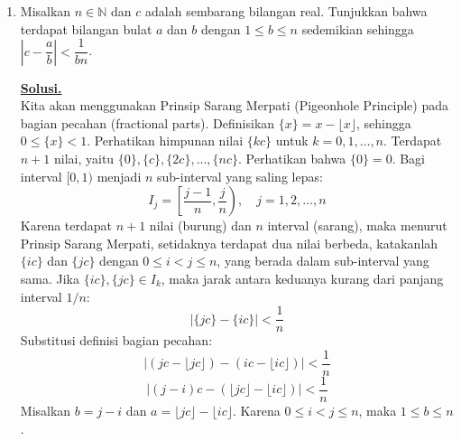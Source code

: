 \documentclass[12pt,twoside]{article}
\newenvironment{solution}
{
	\par\noindent\textbf{\underline{Solusi.}}\\
}
{
	\par
}
\begin{document}
\begin{enumerate}
\begin{solution}
          \textbf{(b) Sanggahan untuk $bac=e$}
          Pernyataan $bac=e$ tidak selalu benar. Ini hanya benar jika grup $G$ abel atau jika $a$ dan $b$ komutatif.
          \textbf{Contoh Penyangkalan:}
          Misalkan $G = S_3$, grup permutasi dari $\{1, 2, 3\}$.
          Pilih $a = (1 \ 2)$ dan $b = (1 \ 3)$.
          Perhatikan bahwa $a^{-1} = a$ dan $b^{-1} = b$.
          Hitung $c$ sedemikian sehingga $abc=e$.
          Maka $c = (ab)^{-1} = b^{-1}a^{-1} = ba$.
          Hitung $a b$:
          \[ a b = (1 \ 2)(1 \ 3) = (1 \ 3 \ 2) \]
          Maka $c = (1 \ 3 \ 2)^{-1} = (1 \ 2 \ 3)$.
          Periksa $abc = (1 \ 3 \ 2)(1 \ 2 \ 3) = e$. (Konsisten).
          Sekarang periksa nilai $bac$:
          Hitung $b a$:
          \[ b a = (1 \ 3)(1 \ 2) = (1 \ 2 \ 3) \]
          Maka:
          \[ bac = (b a) c = (1 \ 2 \ 3)(1 \ 2 \ 3) = (1 \ 3 \ 2) \]
          Karena $(1 \ 3 \ 2) \neq e$, maka pernyataan $bac=e$ bernilai \textbf{salah}.
        \end{solution}
  \item Misalkan $n\in \mathbb{N}$ dan $c$ adalah sembarang bilangan real. Tunjukkan bahwa terdapat bilangan bulat $a$ dan $b$ dengan $1\leq b\leq n$ sedemikian sehingga $\left|c-\dfrac{a}{b}\right|<\dfrac{1}{bn}$.
        \begin{solution}
          Kita akan menggunakan Prinsip Sarang Merpati (Pigeonhole Principle) pada bagian pecahan (fractional parts).
          Definisikan $\{x\} = x - \lfloor x \rfloor$, sehingga $0 \leq \{x\} < 1$.
          Perhatikan himpunan nilai $\{k c\}$ untuk $k = 0, 1, \dots, n$. Terdapat $n+1$ nilai, yaitu $\{0\}, \{c\}, \{2c\}, \dots, \{nc\}$. Perhatikan bahwa $\{0\} = 0$.
          Bagi interval $[0, 1)$ menjadi $n$ sub-interval yang saling lepas:
          \[ I_j = \left[ \frac{j-1}{n}, \frac{j}{n} \right), \quad j = 1, 2, \dots, n \]
          Karena terdapat $n+1$ nilai (burung) dan $n$ interval (sarang), maka menurut Prinsip Sarang Merpati, setidaknya terdapat dua nilai berbeda, katakanlah $\{i c\}$ dan $\{j c\}$ dengan $0 \leq i < j \leq n$, yang berada dalam sub-interval yang sama.
          Jika $\{i c\}, \{j c\} \in I_k$, maka jarak antara keduanya kurang dari panjang interval $1/n$:
          \[ |\{j c\} - \{i c\}| < \frac{1}{n} \]
          Substitusi definisi bagian pecahan:
          \[ |(jc - \lfloor jc \rfloor) - (ic - \lfloor ic \rfloor)| < \frac{1}{n} \]
          \[ |(j-i)c - (\lfloor jc \rfloor - \lfloor ic \rfloor)| < \frac{1}{n} \]
          Misalkan $b = j-i$ dan $a = \lfloor jc \rfloor - \lfloor ic \rfloor$.
          Karena $0 \leq i < j \leq n$, maka $1 \leq b \leq n$.

\end{solution}
\end{enumerate}
\end{document}
